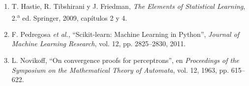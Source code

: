 \documentclass[12pt,a4paper]{article}
\begin{document}
\begin{enumerate}[leftmargin=1.6em,itemsep=0.2em]
  \item T. Hastie, R. Tibshirani y J. Friedman, \emph{The Elements of
  Statistical Learning}, 2.\textsuperscript{a} ed. Springer, 2009,
  capítulos 2 y 4.
  \item F. Pedregosa \emph{et al.}, ``Scikit-learn: Machine Learning in
  Python'', \emph{Journal of Machine Learning Research}, vol. 12,
  pp. 2825--2830, 2011.
  \item L. Novikoff, ``On convergence proofs for perceptrons'', en
  \emph{Proceedings of the Symposium on the Mathematical Theory of Automata},
  vol. 12, 1963, pp. 615--622.
\end{enumerate}
\end{document}

